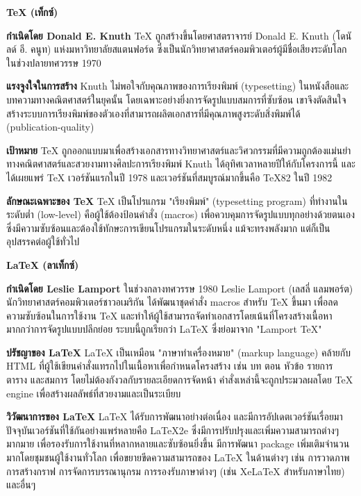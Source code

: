 \hspace*{1.5em} %
\textbf{TeX (เท็กซ์)} %
\begin{mycustomitem}
    \item \textbf{กำเนิดโดย Donald E. Knuth} TeX ถูกสร้างขึ้นโดยศาสตราจารย์ Donald E. Knuth (โดนัลด์ อี. คนูท) แห่งมหาวิทยาลัยสแตนฟอร์ด ซึ่งเป็นนักวิทยาศาสตร์คอมพิวเตอร์ผู้มีชื่อเสียงระดับโลกในช่วงปลายทศวรรษ 1970
    \item \textbf{แรงจูงใจในการสร้าง} Knuth ไม่พอใจกับคุณภาพของการเรียงพิมพ์ (typesetting) ในหนังสือและบทความทางคณิตศาสตร์ในยุคนั้น โดยเฉพาะอย่างยิ่งการจัดรูปแบบสมการที่ซับซ้อน เขาจึงตัดสินใจสร้างระบบการเรียงพิมพ์ของตัวเองที่สามารถผลิตเอกสารที่มีคุณภาพสูงระดับสิ่งพิมพ์ได้ (publication-quality)
    \item \textbf{เป้าหมาย} TeX ถูกออกแบบมาเพื่อสร้างเอกสารทางวิทยาศาสตร์และวิศวกรรมที่มีความถูกต้องแม่นยำทางคณิตศาสตร์และสวยงามทางศิลปะการเรียงพิมพ์ Knuth ได้อุทิศเวลาหลายปีให้กับโครงการนี้ และได้เผยแพร่ TeX เวอร์ชันแรกในปี 1978 และเวอร์ชันที่สมบูรณ์มากขึ้นคือ TeX82 ในปี 1982
    \item \textbf{ลักษณะเฉพาะของ TeX} TeX เป็นโปรแกรม "เรียงพิมพ์" (typesetting program) ที่ทำงานในระดับต่ำ (low-level) คือผู้ใช้ต้องป้อนคำสั่ง (macros) เพื่อควบคุมการจัดรูปแบบทุกอย่างด้วยตนเอง ซึ่งมีความซับซ้อนและต้องใช้ทักษะการเขียนโปรแกรมในระดับหนึ่ง แม้จะทรงพลังมาก แต่ก็เป็นอุปสรรคต่อผู้ใช้ทั่วไป
\end{mycustomitem}

\hspace*{1.5em} %
\textbf{LaTeX (ลาเท็กซ์)} %
\begin{mycustomitem}
    \item \textbf{กำเนิดโดย Leslie Lamport} ในช่วงกลางทศวรรษ 1980 Leslie Lamport (เลสลี่ แลมพอร์ต) นักวิทยาศาสตร์คอมพิวเตอร์ชาวอเมริกัน ได้พัฒนาชุดคำสั่ง macros สำหรับ TeX ขึ้นมา เพื่อลดความซับซ้อนในการใช้งาน TeX และทำให้ผู้ใช้สามารถจัดทำเอกสารโดยเน้นที่โครงสร้างเนื้อหามากกว่าการจัดรูปแบบปลีกย่อย ระบบนี้ถูกเรียกว่า LaTeX ซึ่งย่อมาจาก "Lamport TeX"
    \item \textbf{ปรัชญาของ LaTeX} LaTeX เป็นเหมือน "ภาษาทำเครื่องหมาย" (markup language) คล้ายกับ HTML ที่ผู้ใช้เขียนคำสั่งแทรกไปในเนื้อหาเพื่อกำหนดโครงสร้าง เช่น บท ตอน หัวข้อ รายการ ตาราง และสมการ โดยไม่ต้องกังวลกับรายละเอียดการจัดหน้า คำสั่งเหล่านี้จะถูกประมวลผลโดย TeX engine เพื่อสร้างผลลัพธ์ที่สวยงามและเป็นระเบียบ
    \item \textbf{วิวัฒนาการของ LaTeX} LaTeX ได้รับการพัฒนาอย่างต่อเนื่อง และมีการอัปเดตเวอร์ชันเรื่อยมา ปัจจุบันเวอร์ชันที่ใช้กันอย่างแพร่หลายคือ LaTeX2e ซึ่งมีการปรับปรุงและเพิ่มความสามารถต่างๆ มากมาย เพื่อรองรับการใช้งานที่หลากหลายและซับซ้อนยิ่งขึ้น มีการพัฒนา package เพิ่มเติมจำนวนมากโดยชุมชนผู้ใช้งานทั่วโลก เพื่อขยายขีดความสามารถของ LaTeX ในด้านต่างๆ เช่น การวาดภาพ การสร้างกราฟ การจัดการบรรณานุกรม การรองรับภาษาต่างๆ (เช่น XeLaTeX สำหรับภาษาไทย) และอื่นๆ
\end{mycustomitem}


